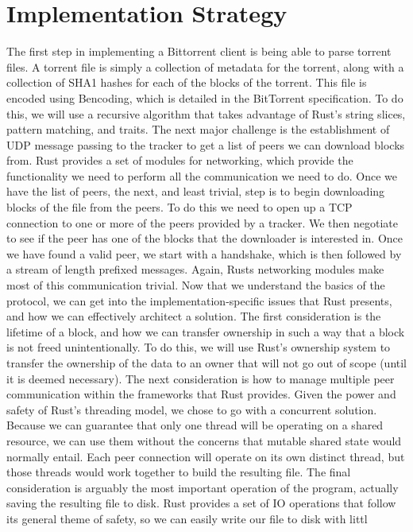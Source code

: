 \documentclass{acm_proc_article-sp}
\begin{document}
\section{Implementation Strategy}
The first step in implementing a Bittorrent client is being able to parse torrent files. A torrent file is simply a collection of metadata for the torrent, along with a collection of SHA1 hashes for each of the blocks of the torrent. This file is encoded using Bencoding, which is detailed in the BitTorrent specification. To do this, we will use a recursive algorithm that takes advantage of Rust’s string slices, pattern matching, and traits.
The next major challenge is the establishment of UDP message passing to the tracker to get a list of peers we can download blocks from. Rust provides a set of modules for networking, which provide the functionality we need to perform all the communication we need to do.
Once we have the list of peers, the next, and least trivial, step is to begin downloading blocks of the file from the peers. To do this we need to open up a TCP connection to one or more of the peers provided by a tracker. We then negotiate to see if the peer has one of the blocks that the downloader is interested in. Once we have found a valid peer, we start with a handshake, which is then followed by a stream of length prefixed messages. Again, Rusts networking modules make most of this communication trivial.
Now that we understand the basics of the protocol, we can get into the implementation-specific issues that Rust presents, and how we can effectively architect a solution. The first consideration is the lifetime of a block, and how we can transfer ownership in such a way that a block is not freed unintentionally. To do this, we will use Rust’s ownership system to transfer the ownership of the data to an owner that will not go out of scope (until it is deemed necessary). The next consideration is how to manage multiple peer communication within the frameworks that Rust provides. Given the power and safety of Rust’s threading model, we chose to go with a concurrent solution. Because we can guarantee that only one thread will be operating on a shared resource, we can use them without the concerns that mutable shared state would normally entail. Each peer connection will operate on its own distinct thread, but those threads would work together to build the resulting file.
The final consideration is arguably the most important operation of the program, actually saving the resulting file to disk. Rust provides a set of IO operations that follow its general theme of safety, so we can easily write our file to disk with littl
\end{document}
